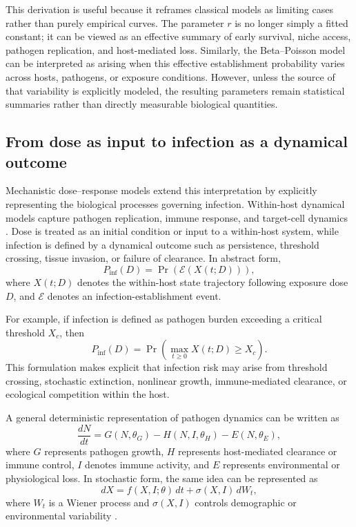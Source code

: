 \documentclass[11pt]{article}
\begin{document}
This derivation is useful because it reframes classical models as limiting cases rather than purely empirical curves. The parameter $r$ is no longer simply a fitted constant; it can be viewed as an effective summary of early survival, niche access, pathogen replication, and host-mediated loss. Similarly, the Beta--Poisson model can be interpreted as arising when this effective establishment probability varies across hosts, pathogens, or exposure conditions. However, unless the source of that variability is explicitly modeled, the resulting parameters remain statistical summaries rather than directly measurable biological quantities.

\subsection{From dose as input to infection as a dynamical outcome} \label{dose-to-infection}
Mechanistic dose--response models extend this interpretation by explicitly representing the biological processes governing infection. Within-host dynamical models capture pathogen replication, immune response, and target-cell dynamics \cite{Moore2020InoculumImmune,Vlazaki2020BacterialReview}. Dose is treated as an initial condition or input to a within-host system, while infection is defined by a dynamical outcome such as persistence, threshold crossing, tissue invasion, or failure of clearance. In abstract form,
\begin{equation}
P_{\mathrm{inf}}(D)=\Pr\left(\mathcal{E}(X(t;D))\right),
\label{eq:abstract_event}
\end{equation}
where $X(t;D)$ denotes the within-host state trajectory following exposure dose $D$, and $\mathcal{E}$ denotes an infection-establishment event.

For example, if infection is defined as pathogen burden exceeding a critical threshold $X_c$, then
\begin{equation}
P_{\mathrm{inf}}(D)
=
\Pr\left(
\max_{t\geq 0} X(t;D) \geq X_c
\right).
\label{eq:threshold_event}
\end{equation}
This formulation makes explicit that infection risk may arise from threshold crossing, stochastic extinction, nonlinear growth, immune-mediated clearance, or ecological competition within the host.

A general deterministic representation of pathogen dynamics can be written as
\begin{equation}
\frac{dN}{dt}
=
G(N,\theta_G)
-
H(N,I,\theta_H)
-
E(N,\theta_E),
\label{eq:general_mechanistic}
\end{equation}
where $G$ represents pathogen growth, $H$ represents host-mediated clearance or immune control, $I$ denotes immune activity, and $E$ represents environmental or physiological loss. In stochastic form, the same idea can be represented as
\begin{equation}
dX = f(X,I;\theta)\,dt + \sigma(X,I)\,dW_t,
\label{eq:stochastic_general}
\end{equation}
where $W_t$ is a Wiener process and $\sigma(X,I)$ controls demographic or environmental variability \cite{Allen2010Stochastic,Murray2002MathematicalBiology1}.
\end{document}
